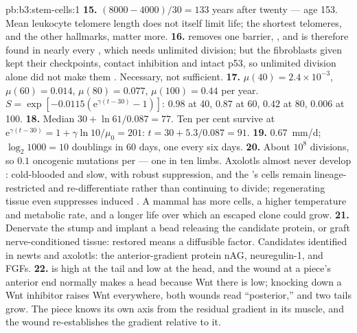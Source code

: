 \begin{solution}{pb:b3:stem-cells:1}
\textbf{15.} $(8000 - 4000)/30 = 133$ years after twenty --- age 153.
Mean leukocyte telomere length does not itself limit life; the shortest
telomeres, and the other hallmarks, matter more.
\textbf{16.}  removes one barrier, ,
and is therefore found in nearly every , which needs unlimited
division; but the fibroblasts given  kept their checkpoints,
contact inhibition and intact p53, so unlimited division alone did not
make them . Necessary, not sufficient.
\textbf{17.} $\mu(40) = 2.4\times 10^{-3}$, $\mu(60) = 0.014$, $\mu(80) =
0.077$, $\mu(100) = 0.44$ per year. $S = \exp[-0.0115(\mathrm{e}^{\gamma
(t-30)} - 1)]$: $0.98$ at 40, $0.87$ at 60, $0.42$ at 80, $0.006$ at
100.
\textbf{18.} Median $30 + \ln 61/0.087 = 77$. Ten per cent survive at
$\mathrm{e}^{\gamma(t-30)} = 1 + \gamma\ln 10/\mu_{0} = 201$: $t = 30 +
5.3/0.087 = 91$.
\textbf{19.} \qty{0.67}{mm/d}; $\log_{2}1000 = 10$ doublings in 60
days, one every six days.
\textbf{20.} About $10^{8}$ divisions, so $0.1$ oncogenic mutations per
 --- one in ten limbs. Axolotls almost never develop
: cold-blooded and slow, with robust  suppression, and the
's cells remain lineage-restricted and re-differentiate rather
than continuing to divide; regenerating tissue even suppresses induced
. A mammal has more cells, a higher temperature and metabolic
rate, and a longer life over which an escaped clone could grow.
\textbf{21.} Denervate the stump and implant a bead releasing the
candidate protein, or graft nerve-conditioned tissue: 
restored means a diffusible factor. Candidates identified in newts and
axolotls: the anterior-gradient protein nAG, neuregulin-1, and FGFs.
\textbf{22.}  is high at the tail and low at the head, and
the wound at a piece's anterior end normally makes a head because Wnt
there is low; knocking down a Wnt inhibitor raises Wnt everywhere,
both wounds read ``posterior,'' and two tails grow. The piece knows its
own axis from the residual gradient in its muscle, and the wound
re-establishes the gradient relative to it.

\end{solution}
